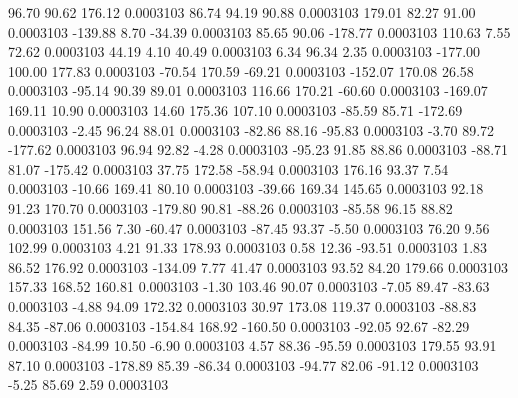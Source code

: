        96.70       90.62      176.12     0.0003103
       86.74       94.19       90.88     0.0003103
      179.01       82.27       91.00     0.0003103
     -139.88        8.70      -34.39     0.0003103
       85.65       90.06     -178.77     0.0003103
      110.63        7.55       72.62     0.0003103
       44.19        4.10       40.49     0.0003103
        6.34       96.34        2.35     0.0003103
     -177.00      100.00      177.83     0.0003103
      -70.54      170.59      -69.21     0.0003103
     -152.07      170.08       26.58     0.0003103
      -95.14       90.39       89.01     0.0003103
      116.66      170.21      -60.60     0.0003103
     -169.07      169.11       10.90     0.0003103
       14.60      175.36      107.10     0.0003103
      -85.59       85.71     -172.69     0.0003103
       -2.45       96.24       88.01     0.0003103
      -82.86       88.16      -95.83     0.0003103
       -3.70       89.72     -177.62     0.0003103
       96.94       92.82       -4.28     0.0003103
      -95.23       91.85       88.86     0.0003103
      -88.71       81.07     -175.42     0.0003103
       37.75      172.58      -58.94     0.0003103
      176.16       93.37        7.54     0.0003103
      -10.66      169.41       80.10     0.0003103
      -39.66      169.34      145.65     0.0003103
       92.18       91.23      170.70     0.0003103
     -179.80       90.81      -88.26     0.0003103
      -85.58       96.15       88.82     0.0003103
      151.56        7.30      -60.47     0.0003103
      -87.45       93.37       -5.50     0.0003103
       76.20        9.56      102.99     0.0003103
        4.21       91.33      178.93     0.0003103
        0.58       12.36      -93.51     0.0003103
        1.83       86.52      176.92     0.0003103
     -134.09        7.77       41.47     0.0003103
       93.52       84.20      179.66     0.0003103
      157.33      168.52      160.81     0.0003103
       -1.30      103.46       90.07     0.0003103
       -7.05       89.47      -83.63     0.0003103
       -4.88       94.09      172.32     0.0003103
       30.97      173.08      119.37     0.0003103
      -88.83       84.35      -87.06     0.0003103
     -154.84      168.92     -160.50     0.0003103
      -92.05       92.67      -82.29     0.0003103
      -84.99       10.50       -6.90     0.0003103
        4.57       88.36      -95.59     0.0003103
      179.55       93.91       87.10     0.0003103
     -178.89       85.39      -86.34     0.0003103
      -94.77       82.06      -91.12     0.0003103
       -5.25       85.69        2.59     0.0003103
